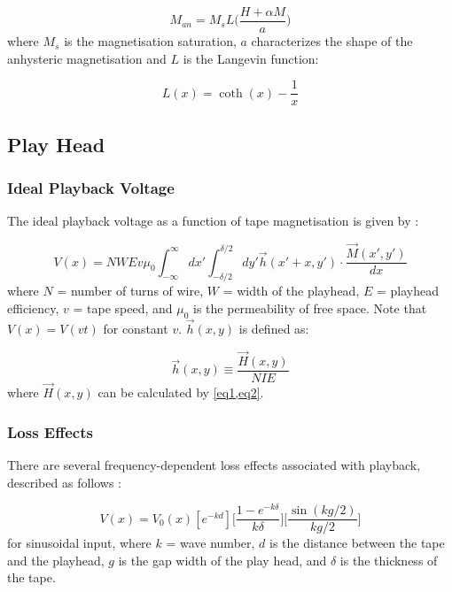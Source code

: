\documentclass[twoside,a4paper]{article}
\begin{document}
\begin{equation}
    M_{an} = M_s L \Big( \frac{H + \alpha M}{a} \Big)
\end{equation}
%
where $M_s$ is the magnetisation saturation, $a$ characterizes the shape
of the anhysteric magnetisation and $L$ is the Langevin function:

\begin{equation}
    L(x) = \coth (x) - \frac{1}{x}
\end{equation}

\subsection{Play Head}
\subsubsection{Ideal Playback Voltage}
The ideal playback voltage as a function of tape magnetisation is given by
\cite{1994tmr..book.....B}:

\begin{equation}
    V(x) =  NWEv \mu_0 \int_{-\infty}^{\infty} dx' \int_{-\delta/2}^{\delta/2} dy' \vec{h}(x' + x, y') \cdot \frac{\vec{M}(x', y')}{dx}
    \label{eq11}
\end{equation}
%
where $N$ = number of turns of wire, $W$ = width of the playhead, $E$ = playhead
efficiency, $v$ = tape speed, and $\mu_0$ is the permeability of free space.
Note that $V(x) = V(vt)$ for constant $v$. $\vec{h}(x, y)$ is defined as:

\begin{equation}
    \vec{h} (x, y) \equiv \frac{\vec{H} (x, y)}{NIE}
    \label{eq12}
\end{equation}
%
where $\vec{H} (x, y)$ can be calculated by \cref{eq1,eq2}.

\subsubsection{Loss Effects}
There are several frequency-dependent loss effects associated with playback,
described as follows \cite{Kadis}:

\begin{equation}
    V(x) = V_0(x) [e^{-kd}] \Big[\frac{1 - e^{-k \delta}}{k \delta} \Big] \Big[\frac{\sin (kg /2)}{kg/2} \Big]
    \label{eq:lossEffects}
\end{equation}
%
for sinusoidal input, where $k$ = wave number, $d$ is the distance between the tape and the playhead,
$g$ is the gap width of the play head, and $\delta$ is the thickness of the tape.
\end{document}
